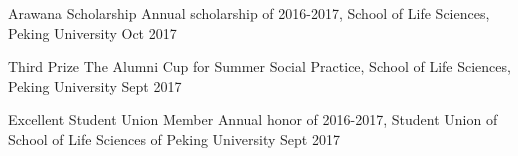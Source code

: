 \begin{cvhonors}

\cvhonor
{Arawana Scholarship} %
{Annual scholarship of 2016-2017, School of Life Sciences, Peking University} %
{} %
{Oct 2017} %


\cvhonor
{Third Prize} %
{The Alumni Cup for Summer Social Practice, School of Life Sciences, Peking University} %
{} %
{Sept 2017} %

\cvhonor
{Excellent Student Union Member} %
{Annual honor of 2016-2017, Student Union of School of Life Sciences of Peking University} %
{} %
{Sept 2017} %


\end{cvhonors}
